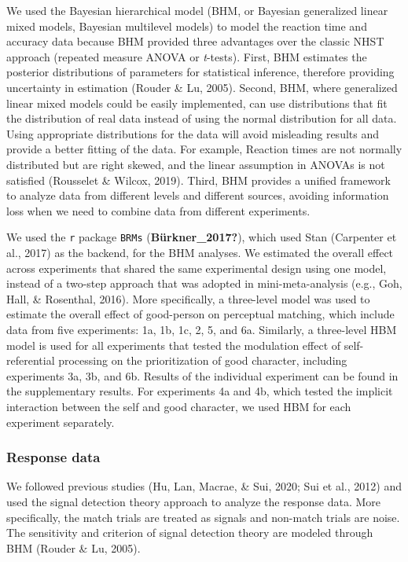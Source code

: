 \documentclass[
  man]{apa6}
\begin{document}
We used the Bayesian hierarchical model (BHM, or Bayesian generalized linear mixed models, Bayesian multilevel models) to model the reaction time and accuracy data because BHM provided three advantages over the classic NHST approach (repeated measure ANOVA or \emph{t}-tests). First, BHM estimates the posterior distributions of parameters for statistical inference, therefore providing uncertainty in estimation (Rouder \& Lu, 2005). Second, BHM, where generalized linear mixed models could be easily implemented, can use distributions that fit the distribution of real data instead of using the normal distribution for all data. Using appropriate distributions for the data will avoid misleading results and provide a better fitting of the data. For example, Reaction times are not normally distributed but are right skewed, and the linear assumption in ANOVAs is not satisfied (Rousselet \& Wilcox, 2019). Third, BHM provides a unified framework to analyze data from different levels and different sources, avoiding information loss when we need to combine data from different experiments.

We used the \texttt{r} package \texttt{BRMs} (\textbf{Bürkner\_2017?}), which used Stan (Carpenter et al., 2017) as the backend, for the BHM analyses. We estimated the overall effect across experiments that shared the same experimental design using one model, instead of a two-step approach that was adopted in mini-meta-analysis (e.g., Goh, Hall, \& Rosenthal, 2016). More specifically, a three-level model was used to estimate the overall effect of good-person on perceptual matching, which include data from five experiments: 1a, 1b, 1c, 2, 5, and 6a. Similarly, a three-level HBM model is used for all experiments that tested the modulation effect of self-referential processing on the prioritization of good character, including experiments 3a, 3b, and 6b. Results of the individual experiment can be found in the supplementary results. For experiments 4a and 4b, which tested the implicit interaction between the self and good character, we used HBM for each experiment separately.

\hypertarget{response-data}{%
\subsubsection{Response data}\label{response-data}}

We followed previous studies (Hu, Lan, Macrae, \& Sui, 2020; Sui et al., 2012) and used the signal detection theory approach to analyze the response data. More specifically, the match trials are treated as signals and non-match trials are noise. The sensitivity and criterion of signal detection theory are modeled through BHM (Rouder \& Lu, 2005).
\end{document}
